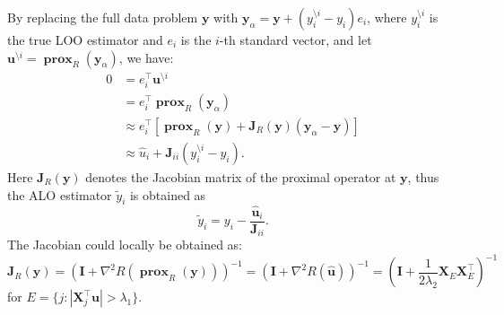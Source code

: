 \documentclass[11pt]{article}
\newcommand{\bu}{\bm{u}}
\newcommand{\by}{\bm{y}}
\newcommand{\bI}{\bm{I}}
\newcommand{\bJ}{\bm{J}}
\newcommand{\bX}{\bm{X}}
\DeclareMathOperator{\bprox}{\mathbf{prox}}
\begin{document}
By replacing the full data problem $\by$ with $\by_{\alpha} = \by + (y_{i}^{\setminus i}-y_{i})e_{i}$, where $y_{i}^{\setminus i}$ is the true LOO estimator and $e_{i}$ is the $i$-th standard vector, and let $\bu^{\setminus i} = \bprox_{R}(\by_{\alpha})$, we have:
\begin{align*}
0 &= e_{i}^{\top}\bu^{\setminus i}\\
& = e_{i}^{\top}\bprox_{R}(\by_{\alpha})\\
& \approx e_{i}^{\top}[\bprox_{R}(\by)+\bJ_{R}(\by)(\by_{\alpha}-\by)]\\
& \approx \hat{u}_{i} + \bJ_{ii}(y_{i}^{\setminus i}-y_{i}).
\end{align*} Here $\bJ_{R}(\by)$ denotes the Jacobian matrix of the proximal operator at $\by$, thus the ALO estimator $\tilde{y}_{i}$ is obtained as \[\tilde{y}_{i} = y_{i} - \frac{\hat{\bu}_{i}}{\bJ_{ii}}.\] The Jacobian could locally be obtained as:\[\bJ_{R}(\by)= (\bI+\nabla^{2}R(\bprox_{R}(\by)))^{-1}= (\bI + \nabla^{2}R(\hat{\bu}))^{-1}= \left(\bI + \frac{1}{2\lambda_{2}}\bX_{E}\bX_{E}^{\top}\right)^{-1}\] for $E = \{j:|\bX_{j}^{\top}\bu|>\lambda_{1}\}$.
\end{document}
